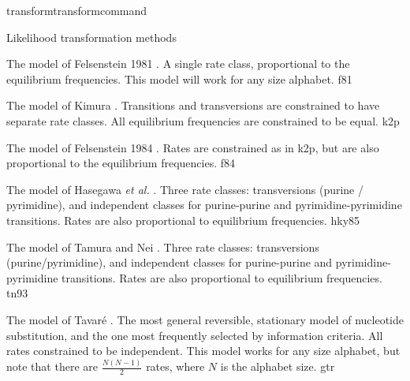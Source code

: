 \begin{command}{transform}{transformcommand}
\begin{arguments}
\begin{argumentgroup}{Likelihood transformation methods}
{\begin{description}
                        {The model of Felsenstein 1981 \cite{felsenstein1981}. A
                        single rate class, proportional to the equilibrium
                        frequencies. This model will work for any size
                        alphabet.}
                        {f81}

                        {The model of Kimura \cite{kimura1980}. Transitions and
                        transversions are constrained to have separate rate
                        classes. All equilibrium frequencies are constrained to be
                        equal.}
                        {k2p}

                        {The model of Felsenstein 1984 \cite{felsenstein1980}. Rates
                        are constrained as in k2p, but are also proportional to
                        the equilibrium frequencies.}
                        {f84}

                        {The model of Hasegawa \emph{et al.} \cite{hasegawa1984}. Three rate classes:
                        transversions (purine / pyrimidine), and independent
                        classes for purine-purine and pyrimidine-pyrimidine
                        transitions. Rates are also proportional to equilibrium
                        frequencies.}
                        {hky85}

                        {The model of Tamura and Nei \cite{tamura1993}. Three
                        rate classes: transversions (purine/pyrimidine), and
                        independent classes for purine-purine and
                        pyrimidine-pyrimidine transitions. Rates are also
                        proportional to equilibrium frequencies.}
                        {tn93}

                        {The model of Tavar\'{e} \cite{tavare1986}. The most general
                        reversible, stationary model of nucleotide substitution,
                        and the one most frequently selected by information
                        criteria. All rates constrained to be independent. This
                        model works for any size alphabet, but note that there
                        are $\frac{N (N-1)}{2}$ rates, where $N$ is the alphabet
                        size.}
                        {gtr}
        

\end{description}}
\end{argumentgroup}
\end{arguments}
\end{command}
